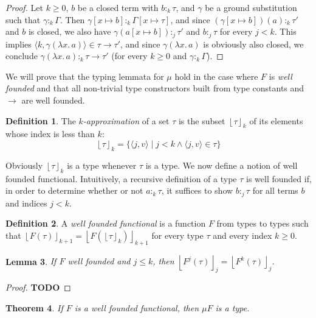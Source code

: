 \documentclass[12pt,a4paper,draft]{article}
\theoremstyle{definition}
\newtheorem{definition}{Definition}
\theoremstyle{plain}
\newtheorem{lemma}[definition]{Lemma}
\newtheorem{theorem}[definition]{Theorem}
\newcommand{\abstr}[2]{\ensuremath{\lambda{#1}.\,{#2}}}
\newcommand{\pair}[1]{\ensuremath{\langle{#1}\rangle}}
\newcommand{\floor}[1]{\ensuremath{\left\lfloor{#1}\right\rfloor}}
\begin{document}
\begin{proof}
  Let $k \ge 0$, $b$ be a closed term with $b :_k \tau$, and $\gamma$ be a ground substitution such
  that $\gamma :_k \Gamma$. Then $\gamma[x \mapsto b] :_k \Gamma[x \mapsto \tau]$, and since
  $(\gamma[x \mapsto b])(a) :_k \tau'$ and $b$ is closed, we also have $\gamma(a[x \mapsto b]) :_j \tau'$
  and $b :_j \tau$ for every $j < k$. This implies $\pair{k,\gamma(\abstr{x}{a})} \in \tau \to \tau'$,
  and since $\gamma(\abstr{x}{a})$ is obviously also closed, we conclude $\gamma(\abstr{x}{a}) :_k \tau \to \tau'$
  (for every $k \ge 0$ and $\gamma :_k \Gamma$).
\end{proof}

We will prove that the typing lemmata for $\mu$ hold in the case where $F$ is \emph{well founded} and
that all non-trivial type constructors built from type constants and $\to$ are well founded.

\begin{definition} \label{def:Approximation}
  The \emph{$k$-approximation} of a set $\tau$ is the subset $\floor{\tau}_k$ of its elements
  whose index is less than $k$:
  \[ \floor{\tau}_k = \{ \pair{j,v} \mid j < k \wedge \pair{j,v} \in \tau \} \]
\end{definition}

Obviously $\floor{\tau}_k$ is a type whenever $\tau$ is a type. We now define a notion of well founded
functional. Intuitively, a recursive definition of a type $\tau$ is well founded if, in order to determine
whether or not $a :_k \tau$, it suffices to show $b :_j \tau$ for all terms $b$ and indices $j < k$.

\begin{definition}
  A \emph{well founded functional} is a function $F$ from types to types such that
  $\floor{F\left(\tau\right)}_{k+1} = \floor{F\left(\floor{\tau}_k\right)}_{k+1}$
  for every type $\tau$ and every index $k \ge 0$.
\end{definition}

\begin{lemma} \label{lem:Approx_F}
  If $F$ well founded and $j \le k$, then
  $\floor{F^j\left(\tau\right)}_j = \floor{F^k\left(\tau\right)}_j$.
\end{lemma}

\begin{proof}
  \textbf{TODO}
\end{proof}

\begin{theorem}
  If $F$ is a well founded functional, then $\mu F$ is a type.
\end{theorem}
\end{document}
